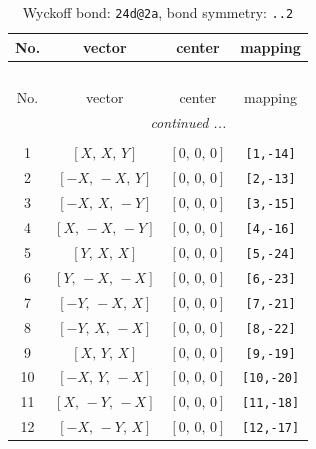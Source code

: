 \documentclass[fleqn,8pt]{jsarticle}
\begin{document}
\renewcommand{\arraystretch}{1.2}
\begin{longtable}{cccc}
\caption{Wyckoff bond: {\tt 24d@2a}, bond symmetry: {\tt ..2}}
 \\
 \hline \hline
No. & vector & center & mapping \\ \hline \endfirsthead

\multicolumn{3}{l}{\tablename\ \thetable{}} \\
 \hline \hline
No. & vector & center & mapping \\ \hline \endhead

 \hline \hline
\multicolumn{3}{r}{\footnotesize\it continued ...} \\ \endfoot

 \hline \hline
\multicolumn{3}{r}{} \\ \endlastfoot

1 & $\left[ X,\, X,\, Y \right]$ & $\left[ 0,\, 0,\, 0 \right]$ & {\tt [1,-14]} \\ \hline
2 & $\left[ - X,\, - X,\, Y \right]$ & $\left[ 0,\, 0,\, 0 \right]$ & {\tt [2,-13]} \\ \hline
3 & $\left[ - X,\, X,\, - Y \right]$ & $\left[ 0,\, 0,\, 0 \right]$ & {\tt [3,-15]} \\ \hline
4 & $\left[ X,\, - X,\, - Y \right]$ & $\left[ 0,\, 0,\, 0 \right]$ & {\tt [4,-16]} \\ \hline
5 & $\left[ Y,\, X,\, X \right]$ & $\left[ 0,\, 0,\, 0 \right]$ & {\tt [5,-24]} \\ \hline
6 & $\left[ Y,\, - X,\, - X \right]$ & $\left[ 0,\, 0,\, 0 \right]$ & {\tt [6,-23]} \\ \hline
7 & $\left[ - Y,\, - X,\, X \right]$ & $\left[ 0,\, 0,\, 0 \right]$ & {\tt [7,-21]} \\ \hline
8 & $\left[ - Y,\, X,\, - X \right]$ & $\left[ 0,\, 0,\, 0 \right]$ & {\tt [8,-22]} \\ \hline
9 & $\left[ X,\, Y,\, X \right]$ & $\left[ 0,\, 0,\, 0 \right]$ & {\tt [9,-19]} \\ \hline
10 & $\left[ - X,\, Y,\, - X \right]$ & $\left[ 0,\, 0,\, 0 \right]$ & {\tt [10,-20]} \\ \hline
11 & $\left[ X,\, - Y,\, - X \right]$ & $\left[ 0,\, 0,\, 0 \right]$ & {\tt [11,-18]} \\ \hline
12 & $\left[ - X,\, - Y,\, X \right]$ & $\left[ 0,\, 0,\, 0 \right]$ & {\tt [12,-17]} \\
\end{longtable}
\renewcommand{\arraystretch}{1.2}
\end{document}
